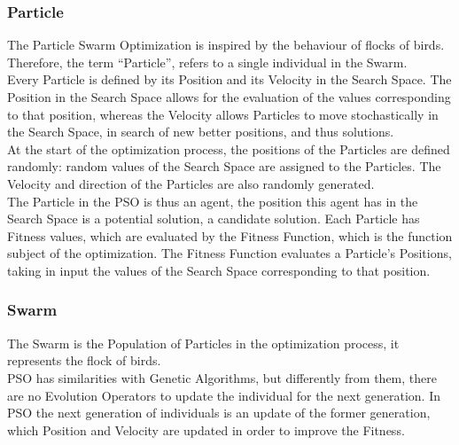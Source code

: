 \subsubsection{Particle}

The Particle Swarm Optimization is inspired by the behaviour of flocks of birds. Therefore, the term “Particle”, refers to a single individual in the Swarm.
\\[0.3cm]Every Particle is defined by its Position and its Velocity in the Search Space.
The Position in the Search Space allows for the evaluation of the values corresponding to that position, whereas the Velocity allows Particles to move stochastically in the Search Space, in search of new better positions, and thus solutions.
% 
\\[0.3cm]At the start of the optimization process, the positions of the Particles are defined randomly: random values of the Search Space are assigned to the Particles.
The Velocity and direction of the Particles are also randomly generated.
% 
\\[0.3cm]The Particle in the PSO is thus an agent, the position this agent has in the Search Space is a potential solution, a candidate solution.
Each Particle has Fitness values, which are evaluated by the Fitness Function, which is the function subject of the optimization.
The Fitness Function evaluates a Particle's Positions, taking in input the values of the Search Space corresponding to that position.

\subsubsection{Swarm}
The Swarm is the Population of Particles in the optimization process, it represents the flock of birds.
\\[0.3cm]PSO has similarities with Genetic Algorithms, but differently from them, there are no Evolution Operators to update the individual for the next generation.
In PSO the next generation of individuals is an update of the former generation, which Position and Velocity are updated in order to improve the Fitness.

